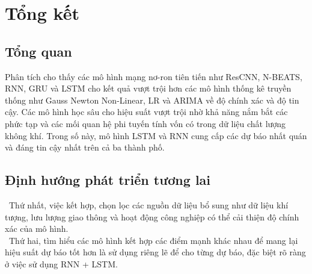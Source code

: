 \documentclass[conference]{IEEEtran}
\begin{document}
\section{Tổng kết}
\subsection{Tổng quan}
Phân tích cho thấy các mô hình mạng nơ-ron tiên tiến như ResCNN, N-BEATS, RNN, GRU và LSTM cho kết quả vượt trội hơn các mô hình thống kê truyền thống như Gauss Newton Non-Linear, LR và ARIMA về độ chính xác và độ tin cậy. Các mô hình học sâu cho hiệu suất vượt trội nhờ khả năng nắm bắt các phức tạp và các mối quan hệ phi tuyến tính vốn có trong dữ liệu chất lượng không khí. Trong số này, mô hình LSTM và RNN cung cấp các dự báo nhất quán và đáng tin cậy nhất trên cả ba thành phố.
\subsection{Định hướng phát triển tương lai}

\indent\textbullet\ Thứ nhất, việc kết hợp, chọn lọc các nguồn dữ liệu bổ sung như dữ liệu khí tượng, lưu lượng giao thông và hoạt động công nghiệp có thể cải thiện độ chính xác của mô hình.\\
\indent\textbullet\ Thứ hai, tìm hiểu các mô hình kết hợp các điểm mạnh khác nhau để mang lại hiệu suất dự báo tốt hơn là sử dụng riêng lẽ để cho từng dự báo, đặc biệt rõ ràng ở việc sử dụng RNN + LSTM.
\end{document}
